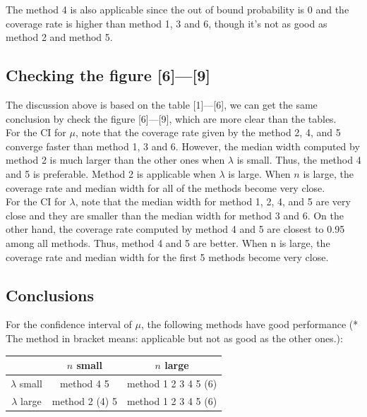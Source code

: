 \documentclass[12pt]{article}
\begin{document}
The method 4 is also applicable since the out of bound probability is 0 and the coverage rate is higher than method 1, 3 and 6, though it's not as good as method 2 and method 5.\\


\subsection{Checking the figure [6]---[9]}
The discussion above is based on the table [1]---[6], we can get the same conclusion by check the figure [6]---[9], which are more clear than the tables.\\

For the CI for $\mu$, note that the coverage rate given by the method 2, 4, and 5 converge faster than method 1, 3 and 6. However, the median width computed by method 2 is much larger than the other ones when $\lambda$ is small. Thus, the method 4 and 5 is preferable. Method 2 is applicable when $\lambda$ is large. When $n$ is large, the coverage rate and median width for all of the methods become very close. \\

For the CI for $\lambda$, note that the median width for method 1, 2, 4, and 5 are very close and they are smaller than the median width for method 3 and 6. On the other hand, the coverage rate computed by method 4 and 5 are closest to 0.95 among all methods. Thus, method 4 and 5 are better. When n is large, the coverage rate and median width for the first 5 methods become very close. \\




\subsection{Conclusions}

For the confidence interval of $\mu$, the following methods have good performance (* The method in bracket means: applicable but not as good as the other ones.):\\

\begin{tabular}{|c|c|c|}
\hline
  & $n$ small & $n$ large\\
 \hline
$\lambda$ small & method 4  5 &  method 1 2 3 4 5 (6)\\
$\lambda$ large & method 2 (4) 5 & method 1 2 3 4 5 (6)\\
\hline
\end{tabular}
\\
\\
\end{document}
